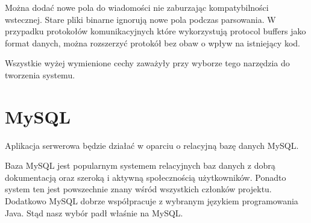 \par{Można dodać nowe pola do wiadomości nie zaburzając kompatybilności wstecznej. Stare pliki binarne ignorują nowe pola podczas parsowania. W przypadku protokołów komunikacyjnych które wykorzystują protocol buffers jako format danych, można rozszerzyć protokół bez obaw o wpływ na istniejący kod.}

\par{Wszystkie wyżej wymienione cechy zaważyły przy wyborze tego narzędzia do tworzenia systemu.}

\section[MySQL]{MySQL}

\par{Aplikacja serwerowa będzie działać w oparciu o relacyjną bazę danych MySQL.} 

\par{Baza MySQL jest popularnym systemem relacyjnych baz danych z dobrą dokumentacją oraz szeroką i aktywną społecznością użytkowników. Ponadto system ten jest powszechnie znany wśród wszystkich członków projektu. Dodatkowo MySQL dobrze współpracuje z wybranym językiem programowania Java. Stąd nasz wybór padł właśnie na MySQL.}
